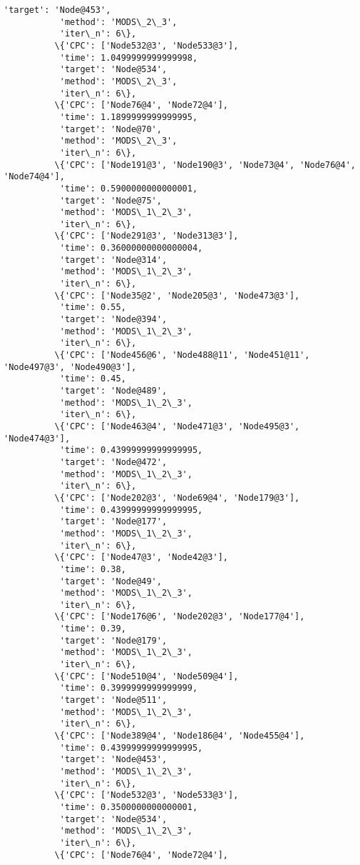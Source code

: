 \documentclass[11pt]{article}
\begin{document}
\begin{Verbatim}[commandchars=\\\{\}]
           'target': 'Node@453',
           'method': 'MODS\_2\_3',
           'iter\_n': 6\},
          \{'CPC': ['Node532@3', 'Node533@3'],
           'time': 1.0499999999999998,
           'target': 'Node@534',
           'method': 'MODS\_2\_3',
           'iter\_n': 6\},
          \{'CPC': ['Node76@4', 'Node72@4'],
           'time': 1.1899999999999995,
           'target': 'Node@70',
           'method': 'MODS\_2\_3',
           'iter\_n': 6\},
          \{'CPC': ['Node191@3', 'Node190@3', 'Node73@4', 'Node76@4', 'Node74@4'],
           'time': 0.5900000000000001,
           'target': 'Node@75',
           'method': 'MODS\_1\_2\_3',
           'iter\_n': 6\},
          \{'CPC': ['Node291@3', 'Node313@3'],
           'time': 0.36000000000000004,
           'target': 'Node@314',
           'method': 'MODS\_1\_2\_3',
           'iter\_n': 6\},
          \{'CPC': ['Node35@2', 'Node205@3', 'Node473@3'],
           'time': 0.55,
           'target': 'Node@394',
           'method': 'MODS\_1\_2\_3',
           'iter\_n': 6\},
          \{'CPC': ['Node456@6', 'Node488@11', 'Node451@11', 'Node497@3', 'Node490@3'],
           'time': 0.45,
           'target': 'Node@489',
           'method': 'MODS\_1\_2\_3',
           'iter\_n': 6\},
          \{'CPC': ['Node463@4', 'Node471@3', 'Node495@3', 'Node474@3'],
           'time': 0.43999999999999995,
           'target': 'Node@472',
           'method': 'MODS\_1\_2\_3',
           'iter\_n': 6\},
          \{'CPC': ['Node202@3', 'Node69@4', 'Node179@3'],
           'time': 0.43999999999999995,
           'target': 'Node@177',
           'method': 'MODS\_1\_2\_3',
           'iter\_n': 6\},
          \{'CPC': ['Node47@3', 'Node42@3'],
           'time': 0.38,
           'target': 'Node@49',
           'method': 'MODS\_1\_2\_3',
           'iter\_n': 6\},
          \{'CPC': ['Node176@6', 'Node202@3', 'Node177@4'],
           'time': 0.39,
           'target': 'Node@179',
           'method': 'MODS\_1\_2\_3',
           'iter\_n': 6\},
          \{'CPC': ['Node510@4', 'Node509@4'],
           'time': 0.3999999999999999,
           'target': 'Node@511',
           'method': 'MODS\_1\_2\_3',
           'iter\_n': 6\},
          \{'CPC': ['Node389@4', 'Node186@4', 'Node455@4'],
           'time': 0.43999999999999995,
           'target': 'Node@453',
           'method': 'MODS\_1\_2\_3',
           'iter\_n': 6\},
          \{'CPC': ['Node532@3', 'Node533@3'],
           'time': 0.3500000000000001,
           'target': 'Node@534',
           'method': 'MODS\_1\_2\_3',
           'iter\_n': 6\},
          \{'CPC': ['Node76@4', 'Node72@4'],

\end{Verbatim}
\end{document}
